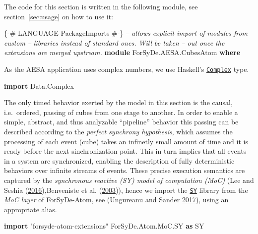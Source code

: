 \documentclass[
  a4paper,
]{article}
\newenvironment{Shaded}{}{}
\newcommand{\CommentTok}[1]{\textcolor[rgb]{0.38,0.63,0.69}{\textit{#1}}}
\newcommand{\DataTypeTok}[1]{\textcolor[rgb]{0.56,0.13,0.00}{#1}}
\newcommand{\KeywordTok}[1]{\textcolor[rgb]{0.00,0.44,0.13}{\textbf{#1}}}
\newcommand{\NormalTok}[1]{#1}
\newcommand{\OtherTok}[1]{\textcolor[rgb]{0.00,0.44,0.13}{#1}}
\begin{document}
The code for this section is written in the following module, see
section~\ref{sec:usage} on how to use it:

\begin{Shaded}
\begin{Highlighting}[numbers=left,,firstnumber=18,]
\OtherTok{\{-# LANGUAGE PackageImports #-\}} \CommentTok{-- allows explicit import of modules from custom}
                                \CommentTok{-- libraries instead of standard ones. Will be taken}
                                \CommentTok{-- out once the extensions are merged upstream.}
\KeywordTok{module} \DataTypeTok{ForSyDe.AESA.CubesAtom} \KeywordTok{where}
\end{Highlighting}
\end{Shaded}

As the AESA application uses complex numbers, we use Haskell's
\href{http://hackage.haskell.org/package/base/docs/Data-Complex.html}{\texttt{Complex}}
type.

\begin{Shaded}
\begin{Highlighting}[numbers=left,,firstnumber=26,]
\KeywordTok{import} \DataTypeTok{Data.Complex}
\end{Highlighting}
\end{Shaded}

The only timed behavior exerted by the model in this section is the
causal, i.e.~ordered, passing of cubes from one stage to another. In
order to enable a simple, abstract, and thus analyzable ``pipeline''
behavior this passing can be described according to the \emph{perfect
synchrony hypothesis}, which assumes the processing of each event (cube)
takes an infinetly small amount of time and it is ready before the next
sinchronization point. This in turn implies that all events in a system
are synchronized, enabling the description of fully deterministic
behaviors over infinite streams of events. These precise execution
semantics are captured by the \emph{synchronous reactive (SY) model of
computation (MoC)} (Lee and Seshia
(\protect\hyperlink{ref-leeseshia-15}{2016}),Benveniste et al.
(\protect\hyperlink{ref-Benveniste03}{2003})), hence we import the
\href{https://forsyde.github.io/forsyde-atom/api/ForSyDe-Atom-MoC-SY.html}{\texttt{SY}}
library from the
\emph{\href{https://forsyde.github.io/forsyde-atom/api/ForSyDe-Atom-MoC.html}{MoC}
layer} of ForSyDe-Atom, see (Ungureanu and Sander
\protect\hyperlink{ref-ungureanu17}{2017}), using an appropriate alias.

\begin{Shaded}
\begin{Highlighting}[numbers=left,,firstnumber=42,]
\KeywordTok{import}\NormalTok{ "forsyde-atom-extensions" }\DataTypeTok{ForSyDe.Atom.MoC.SY}  \KeywordTok{as} \DataTypeTok{SY}
\end{Highlighting}
\end{Shaded}
\end{document}
